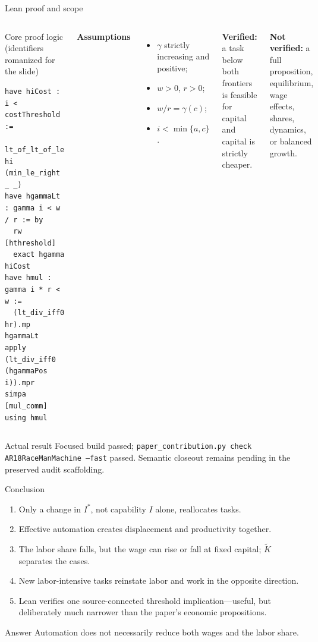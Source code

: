 \documentclass[aspectratio=169,10pt]{beamer}
\newcommand{\Istar}{I^{*}}
\newcommand{\Ktilde}{\widetilde K}
\begin{document}
\begin{frame}[fragile]{Lean proof and scope}
\scriptsize
\begin{columns}[T]
\begin{block}{Core proof logic (identifiers romanized for the slide)}
\begin{verbatim}
have hiCost : i < costThreshold :=
  lt_of_lt_of_le hi (min_le_right _ _)
have hgammaLt : gamma i < w / r := by
  rw [hthreshold]
  exact hgamma hiCost
have hmul : gamma i * r < w :=
  (lt_div_iff0 hr).mp hgammaLt
apply (lt_div_iff0 (hgammaPos i)).mpr
simpa [mul_comm] using hmul
\end{verbatim}
\end{block}
\textbf{Assumptions}
\begin{itemize}
  \item $\gamma$ strictly increasing and positive;
  \item $w>0$, $r>0$;
  \item $w/r=\gamma(c)$;
  \item $i<\min\{a,c\}$.
\end{itemize}
\textbf{Verified:} a task below both frontiers is feasible for capital and
capital is strictly cheaper.

\textbf{Not verified:} a full proposition, equilibrium, wage effects, shares,
dynamics, or balanced growth.
\end{columns}
\vspace{0.3em}
\begin{alertblock}{Actual result}
Focused build passed; \texttt{paper\_contribution.py check
AR18RaceManMachine --fast} passed. Semantic closeout remains pending in the
preserved audit scaffolding.
\end{alertblock}
\end{frame}

\begin{frame}{Conclusion}
\begin{enumerate}
  \item Only a change in $\Istar$, not capability $I$ alone, reallocates tasks.
  \item Effective automation creates displacement and productivity together.
  \item The labor share falls, but the wage can rise or fall at fixed capital;
        $\Ktilde$ separates the cases.
  \item New labor-intensive tasks reinstate labor and work in the opposite
        direction.
  \item Lean verifies one source-connected threshold implication---useful, but
        deliberately much narrower than the paper's economic propositions.
\end{enumerate}
\begin{alertblock}{Answer}
Automation does not necessarily reduce both wages and the labor share.
\end{alertblock}
\end{frame}
\end{document}

